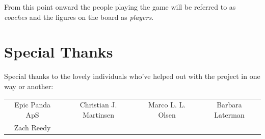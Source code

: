 \documentclass[a4paper]{book}
\begin{document}
\begin{note}
    From this point onward the people playing the game will be referred to as \textit{coaches} and the figures on the board as \textit{players}.
\end{note}

\section*{Special Thanks}
Special thanks to the lovely individuals who've helped out with the project in one way or another:
\begin{center}
    \begin{tabular}{cccc}
        Epic Panda ApS & Christian J. Martinsen & Marco L. L. Olsen & Barbara Laterman \\ Zach Reedy\\
    \end{tabular}
\end{center}

\tableofcontents
\mainmatter


\appendix
%
%
\end{document}
